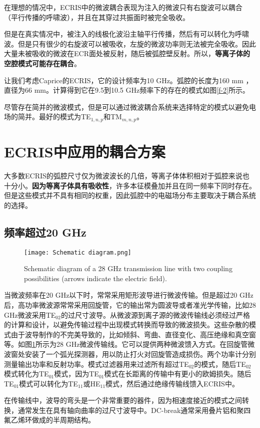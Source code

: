 \documentclass{article}
\begin{document}
在理想的情况中，ECRIS中的微波耦合表现为注入的微波只有右旋波可以耦合（平行传播的呼啸波），并且在其穿过共振面时被完全吸收。

但是在真实情况中，被注入的线极化波沿主轴平行传播，然后有可以转化为呼啸波。但是只有很少的右旋波可以被吸收，左旋的微波功率则无法被完全吸收。因此大量未被吸收的微波在ECR面处被反射，随后被弧腔壁反射。所以，\textbf{等离子体的空腔模式可能存在耦合}。

让我们考虑Caprice的ECRIS，它的设计频率为10 GHz。弧腔的长度为160 mm ，直径为66 mm。计算得到它在9.5到10.5 GHz频率下的存在的模式如图\ref{f-2}所示。

尽管存在简并的微波模式，但是可以通过微波耦合系统来选择特定的模式以避免电场的简并。最好的模式为TE$_{1,n,p}$和TM$_{m,n,p}$。

\section{ECRIS中应用的耦合方案}
大多数ECRIS的弧腔尺寸仅为微波波长的几倍，等离子体体积相对于弧腔来说也十分小。\textbf{因为等离子体具有吸收性}，许多本征模叠加并且在同一频率下同时存在。但是这些模式并不具有相同的权重，因此弧腔中的电磁场分布主要取决于耦合系统的选择。
\subsection{频率超过20 GHz}
\begin{figure}
    \centering
    \texttt{[image: Schematic diagram.png]}
    \caption{Schematic diagram of a 28 GHz transmission line with two coupling possibilities
(arrows indicate the electric field).}
    \label{f-3}
\end{figure}
当微波频率在20 GHz以下时，常常采用矩形波导进行微波传输。但是超过20 GHz后，高功率微波源常常采用回旋管，它的输出常为圆波导或者准光学传输，比如28 GHz微波采用TE$_{02}$的过尺寸波导。从微波源到离子源的微波传输线必须经过严格的计算和设计，以避免传输过程中出现模式转换而导致的微波损失。这些杂散的模式由于波导制作的不完美导致的，比如倾斜、弯曲、直径变化、高压绝缘和真空窗等。如图\ref{f-3}所示为28 GHz微波传输线。它可以提供两种微波馈入方式。在回旋管微波窗处安装了一个弧光探测器，用以防止打火对回旋管造成损伤。两个功率计分别测量输出功率和反射功率。模式过滤器用来过滤所有超过TE$_{02}$的模式，随后TE$_{02}$模式转化为TE$_{01}$模式，因为TE$_{01}$模式在长距离的传输中有更小的欧姆损失。随后TE$_{01}$模式可以转化为TE$_{11}$或HE$_{11}$模式，然后通过绝缘传输线馈入ECRIS中。

在传输线中，波导的弯头是一个非常重要的器件，因为相速度接近的模式之间转换，通常发生在具有轴向曲率的过尺寸波导中。DC-break通常采用叠片铝和聚四氟乙烯环做成的半周期结构。
\end{document}
